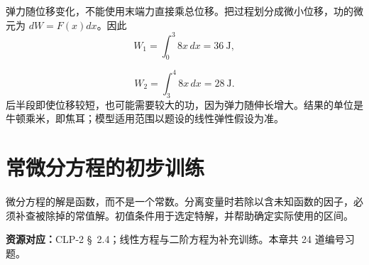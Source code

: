 \documentclass[UTF8,12pt,a4paper,fontset=fandol]{ctexart}
\begin{document}
\begin{solve}\label{ans:c21q24}
弹力随位移变化，不能使用末端力直接乘总位移。把过程划分成微小位移，功的微元为 $dW=F(x)dx$。因此
\[
W_1=\int_0^{3}8x\,dx=36\ \mathrm{J},
\]

\[
W_2=\int_{3}^{4}8x\,dx=28\ \mathrm{J}.
\]
后半段即使位移较短，也可能需要较大的功，因为弹力随伸长增大。结果的单位是牛顿乘米，即焦耳；模型适用范围以题设的线性弹性假设为准。
\end{solve}

\clearpage
\section{常微分方程的初步训练}\label{sec:ch22}
微分方程的解是函数，而不是一个常数。分离变量时若除以含未知函数的因子，必须补查被除掉的常值解。初值条件用于选定特解，并帮助确定实际使用的区间。

\textbf{资源对应：}CLP-2 \S~2.4；线性方程与二阶方程为补充训练。本章共 24 道编号习题。
\end{document}

